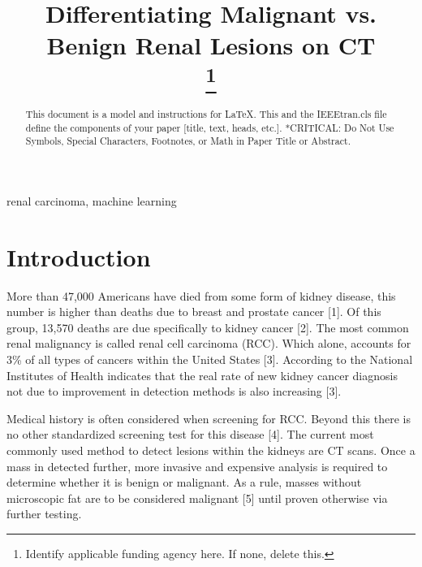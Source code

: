 \documentclass[conference]{IEEEtran}
\begin{document}
\title{Differentiating Malignant vs. Benign Renal Lesions on CT\\
\thanks{Identify applicable funding agency here. If none, delete this.}
}

\author{
\and
{}
\and
{}

}

\maketitle

\begin{abstract}
This document is a model and instructions for \LaTeX.
This and the IEEEtran.cls file define the components of your paper [title, text, heads, etc.]. *CRITICAL: Do Not Use Symbols, Special Characters, Footnotes, 
or Math in Paper Title or Abstract.
\end{abstract}

\begin{IEEEkeywords}
renal carcinoma, machine learning
\end{IEEEkeywords}

\section{Introduction}
More than 47,000 Americans have died from some form of kidney disease, this number is higher than deaths due to breast and prostate cancer [1]. Of this group, 13,570 deaths are due specifically to kidney cancer [2].  The most common renal malignancy is called renal cell carcinoma (RCC).  Which alone, accounts for 3\% of all types of cancers within the United States [3]. According to the National Institutes of Health indicates that the real rate of new kidney cancer diagnosis not due to improvement in detection methods is also increasing [3].   

Medical history is often considered when screening for RCC.  Beyond this there is no other standardized screening test for this disease [4].  The current most commonly used method to detect lesions within the kidneys are CT scans.  Once a mass in detected further, more invasive and expensive analysis is required to determine whether it is benign or malignant.  As a rule, masses without microscopic fat are to be considered malignant [5] until proven otherwise via further testing. 
\end{document}
